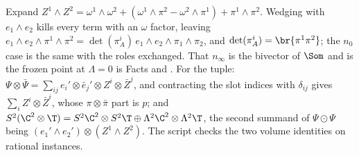 Expand $Z^{1} \wedge Z^{2} = \omega^{1}\wedge\omega^{2} + (\omega^{1}\wedge\pi^{2} - \omega^{2}\wedge\pi^{1}) + \pi^{1}\wedge\pi^{2}$. Wedging with $e_{1} \wedge e_{2}$ kills every term with an $\omega$ factor, leaving $e_{1}\wedge e_{2}\wedge\pi^{1}\wedge\pi^{2} = \det(\pi^{i}_{A})\,e_{1}\wedge e_{2}\wedge\pi_{1}\wedge\pi_{2}$, and $\det(\pi^{i}_{A}) = \br{\pi^{1}\pi^{2}}$; the $n_{0}$ case is the same with the roles exchanged. That $n_{\infty}$ is the bivector of $\Som$ and is the frozen point at $\Lambda = 0$ is Facts  and . For the tuple: $\Psi \otimes \bar\Psi = \sum_{ij} e_{i}' \otimes \bar e_{j}' \otimes Z^{i} \otimes \bar Z^{j}$, and contracting the slot indices with $\delta_{ij}$ gives $\sum_{i} Z^{i} \otimes \bar Z^{i}$, whose $\pi \otimes \bar\pi$ part is $p$; and $S^{2}(\C^{2} \otimes \T) = S^{2}\C^{2} \otimes S^{2}\T \oplus \Lambda^{2}\C^{2} \otimes \Lambda^{2}\T$, the second summand of $\Psi \odot \Psi$ being $(e_{1}' \wedge e_{2}') \otimes (Z^{1} \wedge Z^{2})$. The script checks the two volume identities on rational instances.

